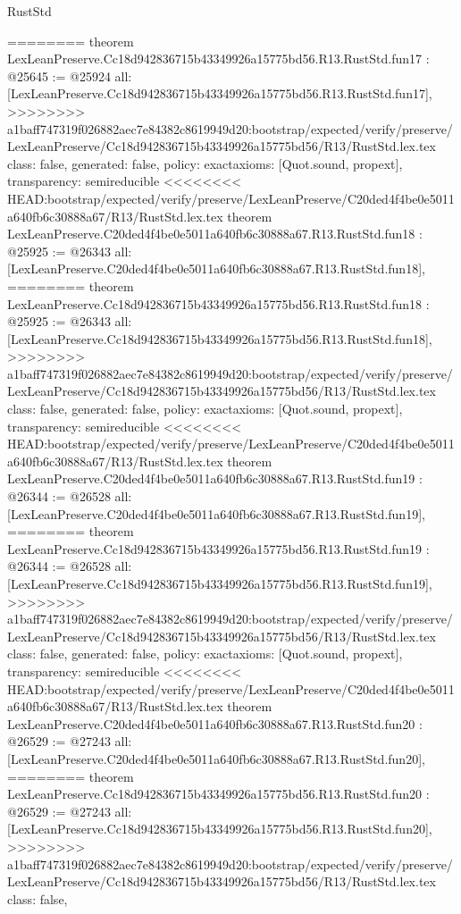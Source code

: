 \begin{lexlean}{RustStd}
\begin{coremodule}
{\begin{coremodule}
{{{{{{{{{{{{{{{{{{{{========
theorem LexLeanPreserve.Cc18d942836715b43349926a15775bd56.R13.RustStd.fun17 : @25645 := @25924 {
  all: [LexLeanPreserve.Cc18d942836715b43349926a15775bd56.R13.RustStd.fun17],
>>>>>>>> a1baff747319f026882aec7e84382c8619949d20:bootstrap/expected/verify/preserve/LexLeanPreserve/Cc18d942836715b43349926a15775bd56/R13/RustStd.lex.tex
  class: false,
  generated: false,
  policy: exact{axioms: [Quot.sound, propext]},
  transparency: semireducible
}
<<<<<<<< HEAD:bootstrap/expected/verify/preserve/LexLeanPreserve/C20ded4f4be0e5011a640fb6c30888a67/R13/RustStd.lex.tex
theorem LexLeanPreserve.C20ded4f4be0e5011a640fb6c30888a67.R13.RustStd.fun18 : @25925 := @26343 {
  all: [LexLeanPreserve.C20ded4f4be0e5011a640fb6c30888a67.R13.RustStd.fun18],
========
theorem LexLeanPreserve.Cc18d942836715b43349926a15775bd56.R13.RustStd.fun18 : @25925 := @26343 {
  all: [LexLeanPreserve.Cc18d942836715b43349926a15775bd56.R13.RustStd.fun18],
>>>>>>>> a1baff747319f026882aec7e84382c8619949d20:bootstrap/expected/verify/preserve/LexLeanPreserve/Cc18d942836715b43349926a15775bd56/R13/RustStd.lex.tex
  class: false,
  generated: false,
  policy: exact{axioms: [Quot.sound, propext]},
  transparency: semireducible
}
<<<<<<<< HEAD:bootstrap/expected/verify/preserve/LexLeanPreserve/C20ded4f4be0e5011a640fb6c30888a67/R13/RustStd.lex.tex
theorem LexLeanPreserve.C20ded4f4be0e5011a640fb6c30888a67.R13.RustStd.fun19 : @26344 := @26528 {
  all: [LexLeanPreserve.C20ded4f4be0e5011a640fb6c30888a67.R13.RustStd.fun19],
========
theorem LexLeanPreserve.Cc18d942836715b43349926a15775bd56.R13.RustStd.fun19 : @26344 := @26528 {
  all: [LexLeanPreserve.Cc18d942836715b43349926a15775bd56.R13.RustStd.fun19],
>>>>>>>> a1baff747319f026882aec7e84382c8619949d20:bootstrap/expected/verify/preserve/LexLeanPreserve/Cc18d942836715b43349926a15775bd56/R13/RustStd.lex.tex
  class: false,
  generated: false,
  policy: exact{axioms: [Quot.sound, propext]},
  transparency: semireducible
}
<<<<<<<< HEAD:bootstrap/expected/verify/preserve/LexLeanPreserve/C20ded4f4be0e5011a640fb6c30888a67/R13/RustStd.lex.tex
theorem LexLeanPreserve.C20ded4f4be0e5011a640fb6c30888a67.R13.RustStd.fun20 : @26529 := @27243 {
  all: [LexLeanPreserve.C20ded4f4be0e5011a640fb6c30888a67.R13.RustStd.fun20],
========
theorem LexLeanPreserve.Cc18d942836715b43349926a15775bd56.R13.RustStd.fun20 : @26529 := @27243 {
  all: [LexLeanPreserve.Cc18d942836715b43349926a15775bd56.R13.RustStd.fun20],
>>>>>>>> a1baff747319f026882aec7e84382c8619949d20:bootstrap/expected/verify/preserve/LexLeanPreserve/Cc18d942836715b43349926a15775bd56/R13/RustStd.lex.tex
  class: false,
}}}}}}}}}}}}}}}}}}}}}}}}
\end{coremodule}}
\end{coremodule}
\end{lexlean}
